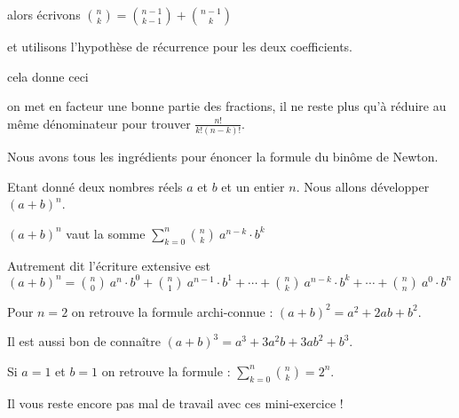\change

alors écrivons $\binom n k = \binom{n-1}{k-1} + \binom{n-1}{k}$

\change

et utilisons l'hypothèse de récurrence pour les deux coefficients.

cela donne ceci 


\change

on met en facteur une bonne partie des fractions, il ne reste plus qu'à réduire au même
dénominateur pour trouver $\frac{n!}{k!(n-k)!}$.


\diapo

Nous avons tous les ingrédients pour énoncer la formule du binôme de Newton.

Etant donné deux nombres réels $a$ et $b$ et un entier $n$.
Nous allons développer $(a+b)^n$.

\change

$(a+b)^n$ vaut la somme $\sum_{k=0}^n \binom{n}{k} \ a^{n-k} \cdot b^{k}$

\change

Autrement dit l'écriture extensive est 
$(a+b)^n = \binom{n}{0}\ a^n\cdot b^0 + \binom{n}{1}\ a^{n-1}\cdot b^{1}
+ \cdots + \binom{n}{k} \ a^{n-k} \cdot b^{k}+\cdots + \binom{n}{n}\ a^0\cdot b^n$

\change

Pour $n=2$ on retrouve la formule archi-connue : $(a+b)^2= a^2 + 2ab + b^2$.

\change

Il est aussi bon de connaître $(a+b)^3 = a^3 + 3a^2b + 3ab^2 + b^3$.

\change

Si $a=1$ et $b=1$ on retrouve la formule : $\sum_{k=0}^n \binom{n}{k} = 2^n$.


\diapo

Il vous reste encore pas mal de travail avec ces mini-exercice !



